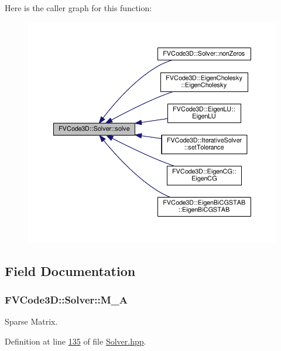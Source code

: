 Here is the caller graph for this function\+:
\nopagebreak
\begin{figure}[H]
\begin{center}
\leavevmode
\includegraphics[width=350pt]{classFVCode3D_1_1Solver_afefcde44126886bafbc85ca0ce22dca8_icgraph}
\end{center}
\end{figure}




\subsection{Field Documentation}
\subsubsection[{\texorpdfstring{M\+\_\+A}{M_A}}]{ F\+V\+Code3\+D\+::\+Solver\+::\+M\+\_\+A\hspace{0.3cm}{\ttfamily [protected]}}\hypertarget{classFVCode3D_1_1Solver_a7a7d556033c96bef473a2dc694af9036}{}\label{classFVCode3D_1_1Solver_a7a7d556033c96bef473a2dc694af9036}


Sparse Matrix. 



Definition at line \hyperlink{Solver_8hpp_source_l00135}{135} of file \hyperlink{Solver_8hpp_source}{Solver.\+hpp}.

